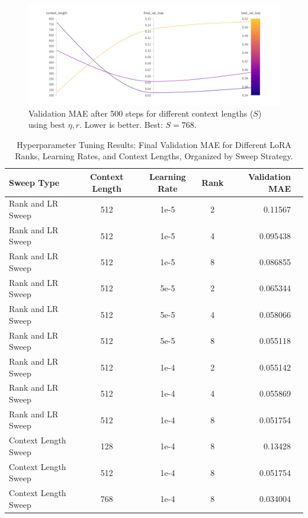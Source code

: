 \documentclass{article}
\begin{document}
\begin{figure}[!htbp]
    \centering
    \includegraphics[width=0.6\linewidth]{M2 Course Work//Images/sweep_context_length_result.png}
    \caption{Validation MAE after 500 steps for different context lengths ($S$) using best $\eta, r$. Lower is better. Best: $S=768$.} %
    \label{fig:context_search_results}
\end{figure}


\begin{table}[!h]
\renewcommand{\arraystretch}{1.4}
\centering
\setlength{\tabcolsep}{8pt} %
\begin{tabular}{lcccrS[round-precision=6]} %
    \toprule
    \textbf{Sweep Type} & \textbf{Context Length} & \textbf{Learning Rate} & {\textbf{Rank}} & {\textbf{Validation MAE}} \\ %
    \midrule
    Rank and LR Sweep   & 512 & 1e-5 & 2 & 0.11567  \\
    Rank and LR Sweep   & 512 & 1e-5 & 4 & 0.095438 \\
    Rank and LR Sweep   & 512 & 1e-5 & 8 & 0.086855 \\
    Rank and LR Sweep   & 512 & 5e-5 & 2 & 0.065344 \\
    Rank and LR Sweep   & 512 & 5e-5 & 4 & 0.058066 \\
    Rank and LR Sweep   & 512 & 5e-5 & 8 & 0.055118 \\
    Rank and LR Sweep   & 512 & 1e-4 & 2 & 0.055142 \\ %
    Rank and LR Sweep   & 512 & 1e-4 & 4 & 0.055869 \\ %
    Rank and LR Sweep   & 512 & 1e-4 & 8 & 0.051754 \\ %
    \midrule %
    Context Length Sweep& 128 & 1e-4 & 8 & 0.13428  \\
    Context Length Sweep& 512 & 1e-4 & 8 & 0.051754 \\
    Context Length Sweep& 768 & 1e-4 & 8 & 0.034004 \\
    \bottomrule
\end{tabular}
\caption{Hyperparameter Tuning Results: Final Validation MAE for Different LoRA Ranks, Learning Rates, and Context Lengths, Organized by Sweep Strategy.}
\label{tab:experiment_results_by_sweep} %
\end{table}
\end{document}
